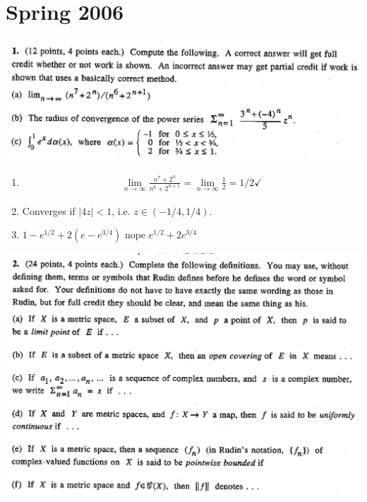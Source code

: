 \section{Spring 2006}

\includegraphics[width=400pt]{img/analysis--berkeley-104-final--spring-2006-6245.png}

\begin{enumerate}[label=(\alph*)]
\item
\begin{align*}
    \lim_{n\to\infty} \frac{n^7 + 2^n}{n^6 + 2^{n+1}}
   = \lim_{n\to\infty} \frac{1}{2}
   = 1/2 \checkmark
\end{align*}
\item Converges if $|4z| < 1$, i.e. $z \in (-1/4, 1/4)$. \checkmark
\item $1 - e^{1/2} + 2(e - e^{3/4})$ nope $e^{1/2} + 2e^{3/4}$
\end{enumerate}


\includegraphics[width=400pt]{img/analysis--berkeley-104-final--spring-2006-d466.png}


